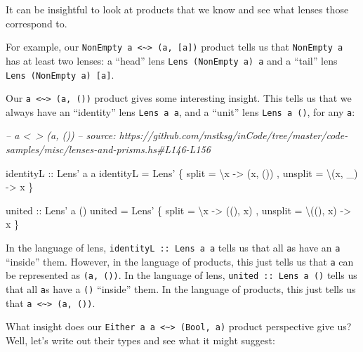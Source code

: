 \documentclass[]{article}
\newenvironment{Shaded}{}{}
\newcommand{\CommentTok}[1]{\textcolor[rgb]{0.38,0.63,0.69}{\textit{#1}}}
\newcommand{\DataTypeTok}[1]{\textcolor[rgb]{0.56,0.13,0.00}{#1}}
\newcommand{\FunctionTok}[1]{\textcolor[rgb]{0.02,0.16,0.49}{#1}}
\newcommand{\NormalTok}[1]{#1}
\newcommand{\OtherTok}[1]{\textcolor[rgb]{0.00,0.44,0.13}{#1}}
\begin{document}
It can be insightful to look at products that we know and see what lenses those
correspond to.

For example, our
\texttt{NonEmpty\ a\ \textless{}\textasciitilde{}\textgreater{}\ (a,\ {[}a{]})}
product tells us that \texttt{NonEmpty\ a} has at least two lenses: a ``head''
lens \texttt{Lens\textquotesingle{}\ (NonEmpty\ a)\ a} and a ``tail'' lens
\texttt{Lens\textquotesingle{}\ (NonEmpty\ a)\ {[}a{]}}.

Our \texttt{a\ \textless{}\textasciitilde{}\textgreater{}\ (a,\ ())} product
gives some interesting insight. This tells us that we always have an
``identity'' lens \texttt{Lens\textquotesingle{}\ a\ a}, and a ``unit'' lens
\texttt{Lens\textquotesingle{}\ a\ ()}, for any \texttt{a}:

\begin{Shaded}
\begin{Highlighting}[]
\CommentTok{-- a <~> (a, ())}
\CommentTok{-- source: https://github.com/mstksg/inCode/tree/master/code-samples/misc/lenses-and-prisms.hs#L146-L156}

\OtherTok{identityL ::} \DataTypeTok{Lens'}\NormalTok{ a a}
\NormalTok{identityL }\FunctionTok{=} \DataTypeTok{Lens'}
\NormalTok{    \{ split   }\FunctionTok{=}\NormalTok{ \textbackslash{}x      }\OtherTok{->}\NormalTok{ (x, ())}
\NormalTok{    , unsplit }\FunctionTok{=}\NormalTok{ \textbackslash{}(x, _) }\OtherTok{->}\NormalTok{ x}
\NormalTok{    \}}

\OtherTok{united ::} \DataTypeTok{Lens'}\NormalTok{ a ()}
\NormalTok{united }\FunctionTok{=} \DataTypeTok{Lens'}
\NormalTok{    \{ split   }\FunctionTok{=}\NormalTok{ \textbackslash{}x       }\OtherTok{->}\NormalTok{ ((), x)}
\NormalTok{    , unsplit }\FunctionTok{=}\NormalTok{ \textbackslash{}((), x) }\OtherTok{->}\NormalTok{ x}
\NormalTok{    \}}
\end{Highlighting}
\end{Shaded}

In the language of lens, \texttt{identityL\ ::\ Lens\textquotesingle{}\ a\ a}
tells us that all \texttt{a}s have an \texttt{a} ``inside'' them. However, in
the language of products, this just tells us that \texttt{a} can be represented
as \texttt{(a,\ ())}. In the language of lens,
\texttt{united\ ::\ Lens\textquotesingle{}\ a\ ()} tells us that all \texttt{a}s
have a \texttt{()} ``inside'' them. In the language of products, this just tells
us that \texttt{a\ \textless{}\textasciitilde{}\textgreater{}\ (a,\ ())}.

What insight does our
\texttt{Either\ a\ a\ \textless{}\textasciitilde{}\textgreater{}\ (Bool,\ a)}
product perspective give us? Well, let's write out their types and see what it
might suggest:
\end{document}
